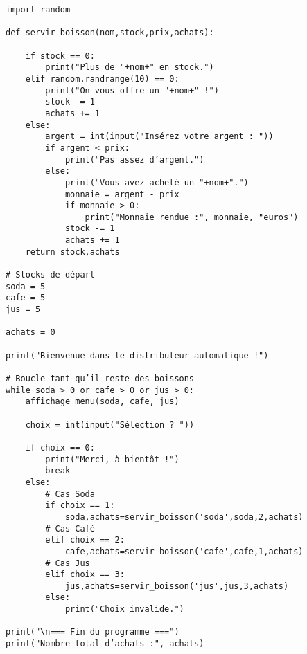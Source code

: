 \begin{verbatim}
import random

def servir_boisson(nom,stock,prix,achats):

    if stock == 0:
        print("Plus de "+nom+" en stock.")
    elif random.randrange(10) == 0:
        print("On vous offre un "+nom+" !")
        stock -= 1
        achats += 1
    else:
        argent = int(input("Insérez votre argent : "))
        if argent < prix:
            print("Pas assez d’argent.")
        else:
            print("Vous avez acheté un "+nom+".")
            monnaie = argent - prix
            if monnaie > 0:
                print("Monnaie rendue :", monnaie, "euros")
            stock -= 1
            achats += 1
    return stock,achats

# Stocks de départ
soda = 5
cafe = 5
jus = 5

achats = 0

print("Bienvenue dans le distributeur automatique !")

# Boucle tant qu’il reste des boissons
while soda > 0 or cafe > 0 or jus > 0:
    affichage_menu(soda, cafe, jus)
    
    choix = int(input("Sélection ? "))

    if choix == 0:
        print("Merci, à bientôt !")
        break
    else:
        # Cas Soda
        if choix == 1:
            soda,achats=servir_boisson('soda',soda,2,achats)
        # Cas Café
        elif choix == 2:
            cafe,achats=servir_boisson('cafe',cafe,1,achats)
        # Cas Jus
        elif choix == 3:
            jus,achats=servir_boisson('jus',jus,3,achats)
        else:
            print("Choix invalide.")

print("\n=== Fin du programme ===")
print("Nombre total d’achats :", achats)
\end{verbatim}



